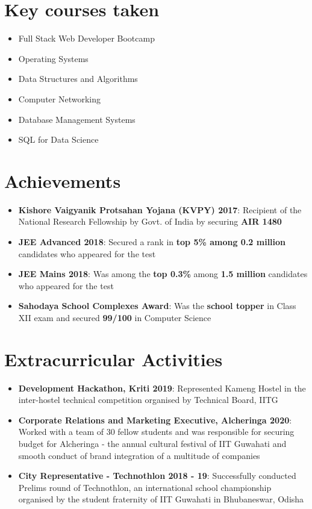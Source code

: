 \documentclass[a4paper,10pt]{report}
\newcommand{\resumeItem}[2]{
  \item\small{
    \textbf{#1}{: #2 \vspace{-2pt}}
  }
}
\newcommand{\resumeSubItem}[2]{\resumeItem{#1}{#2}\vspace{-4pt}}
\newcommand{\resumeSubHeadingListStart}{\begin{itemize}[leftmargin=*]}
\newcommand{\resumeSubHeadingListEnd}{\end{itemize}}
\begin{document}
 \section{Key courses taken}
\vspace{-2pt}
 \begin{multicols}{2}
 \begin{itemize}[leftmargin = *,itemsep=-3pt]
 
\item Full Stack Web Developer Bootcamp
\item Operating Systems
\item Data Structures and Algorithms
%
\item Computer Networking
\item Database Management Systems
\item SQL for Data Science

\end{itemize}
\end{multicols}
 
\vspace{1pt}
\section{Achievements}
\resumeSubHeadingListStart
\resumeSubItem{Kishore Vaigyanik Protsahan Yojana (KVPY) 2017}{Recipient of the National Research Fellowship by Govt. of India by securing \textbf{AIR 1480}}
\vspace{2pt}
\resumeSubItem{JEE Advanced 2018}{Secured a rank in \textbf{top 5\% among 0.2 million} candidates who appeared for the test}
\vspace{2pt}
\resumeSubItem{JEE Mains 2018}{Was among the \textbf{top 0.3\%} among \textbf{1.5 million} candidates who appeared for the test}
\vspace{2pt}
\resumeSubItem{Sahodaya School Complexes Award}{Was the \textbf{school topper} in Class XII exam and secured \textbf{99/100} in Computer Science}
\resumeSubHeadingListEnd
 

\vspace{1.5pt}
\section{Extracurricular Activities}
\resumeSubHeadingListStart
\resumeSubItem{Development Hackathon, Kriti 2019}{Represented Kameng Hostel in the inter-hostel technical competition organised by Technical Board, IITG}
\vspace{2pt}
\resumeSubItem{Corporate Relations and Marketing Executive, Alcheringa 2020}{Worked with a team of 30 fellow students and was responsible for securing budget for Alcheringa - the annual cultural festival of IIT Guwahati and smooth conduct of brand integration of a multitude of companies}
\vspace{2pt}
\resumeSubItem{City Representative - Technothlon 2018 - 19}{Successfully conducted Prelims round of Technothlon, an international school championship organised by the student fraternity of IIT Guwahati in Bhubaneswar, Odisha}
\resumeSubHeadingListEnd
 
\end{document}
